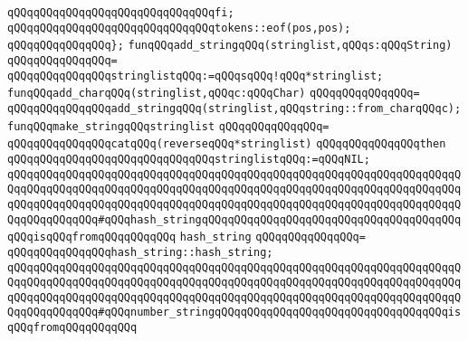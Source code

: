 \verb|qQQqqQQqqQQqqQQqqQQqqQQqqQQqqQQqfi;|\newline
\newline
\verb|qQQqqQQqqQQqqQQqqQQqqQQqqQQqqQQqtokens::eof(pos,pos);|\newline
\verb|qQQqqQQqqQQqqQQq};|\newline
\newline
\newline
\verb|funqQQqadd_stringqQQq(stringlist,qQQqs:qQQqString)|\newline
\verb|qQQqqQQqqQQqqQQq=|\newline
\verb|qQQqqQQqqQQqqQQqstringlistqQQq:=qQQqsqQQq!qQQq*stringlist;|\newline
\newline
\newline
\verb|funqQQqadd_charqQQq(stringlist,qQQqc:qQQqChar)|\newline
\verb|qQQqqQQqqQQqqQQq=|\newline
\verb|qQQqqQQqqQQqqQQqadd_stringqQQq(stringlist,qQQqstring::from_charqQQqc);|\newline
\newline
\newline
\verb|funqQQqmake_stringqQQqstringlist|\newline
\verb|qQQqqQQqqQQqqQQq=|\newline
\verb|qQQqqQQqqQQqqQQqcatqQQq(reverseqQQq*stringlist)|\newline
\verb|qQQqqQQqqQQqqQQqthen|\newline
\verb|qQQqqQQqqQQqqQQqqQQqqQQqqQQqqQQqstringlistqQQq:=qQQqNIL;|\newline
\newline
\verb|qQQqqQQqqQQqqQQqqQQqqQQqqQQqqQQqqQQqqQQqqQQqqQQqqQQqqQQqqQQqqQQqqQQqqQQqqQQqqQQqqQQqqQQqqQQqqQQqqQQqqQQqqQQqqQQqqQQqqQQqqQQqqQQqqQQqqQQqqQQqqQQqqQQqqQQqqQQqqQQqqQQqqQQqqQQqqQQqqQQqqQQqqQQqqQQqqQQqqQQqqQQqqQQqqQQqqQQqqQQqqQQq#qQQqhash_stringqQQqqQQqqQQqqQQqqQQqqQQqqQQqqQQqqQQqqQQqqQQqisqQQqfromqQQqqQQqqQQq|\newline
\verb|hash_string|\newline
\verb|qQQqqQQqqQQqqQQq=|\newline
\verb|qQQqqQQqqQQqqQQqhash_string::hash_string;|\newline
\newline
\verb|qQQqqQQqqQQqqQQqqQQqqQQqqQQqqQQqqQQqqQQqqQQqqQQqqQQqqQQqqQQqqQQqqQQqqQQqqQQqqQQqqQQqqQQqqQQqqQQqqQQqqQQqqQQqqQQqqQQqqQQqqQQqqQQqqQQqqQQqqQQqqQQqqQQqqQQqqQQqqQQqqQQqqQQqqQQqqQQqqQQqqQQqqQQqqQQqqQQqqQQqqQQqqQQqqQQqqQQqqQQqqQQq#qQQqnumber_stringqQQqqQQqqQQqqQQqqQQqqQQqqQQqqQQqqQQqisqQQqfromqQQqqQQqqQQq|\newline
